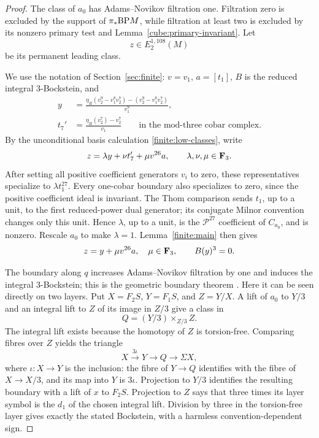 \begin{proof}
The class of \(a_0\) has Adams--Novikov filtration one.  Filtration
zero is excluded by the support of \(\pi_*\mathrm{BP} M\), while filtration
at least two is excluded by its nonzero primary test and
Lemma~\ref{cube:primary-invariant}.  Let
\[
 z\in E_2^{1,108}(M)
\]
be its permanent leading class.

We use the notation of Section~\ref{sec:finite}: \(v=v_1\),
\(a=[t_1]\), \(B\) is the reduced integral 3-Bockstein, and
\begin{align*}
 y&=\frac{\eta_R(v_2^9-v_1^8v_2^7)-(v_2^9-v_1^8v_2^7)}{v_1^9},\\
 t_7'&=\frac{\eta_R(v_2^7)-v_2^7}{v_1}
 \qquad\text{in the mod-three cobar complex}.
\end{align*}
By the unconditional basis calculation \eqref{finite:low-classes}, write
\[
 z=\lambda y+\nu t'_7+\mu v^{26}a,
 \qquad \lambda,\nu,\mu\in\mathbf F_3.
\]
After setting all positive coefficient generators \(v_i\) to zero,
these representatives specialize to \(\lambda t_1^{27}\).
Every one-cobar boundary also specializes to zero, since the
positive coefficient ideal is invariant.  The Thom comparison
sends \(t_1\), up to a unit, to the first reduced-power dual
generator; its conjugate Milnor convention changes only this
unit.  Hence \(\lambda\), up to a unit, is the
\(\mathcal P^{27}\) coefficient of \(C_{a_0}\), and is nonzero.
Rescale \(a_0\) to make \(\lambda=1\).
Lemma~\ref{finite:main} then gives
\begin{equation}\label{cube:leading-class}
 z=y+\mu v^{26}a,\quad\mu\in\mathbf F_3,\qquad B(y)^3=0.
\end{equation}

The boundary along \(q\) increases Adams--Novikov filtration by one
and induces the integral 3-Bockstein; this is the geometric boundary
theorem \cite[Theorem~2.3.4]{Ravenel}.  Here it can be seen directly
on two layers.  Put \(X=F_2S\), \(Y=F_1S\), and \(Z=Y/X\).
A lift of \(a_0\) to \(Y/3\) and an integral lift to \(Z\) of its
image in \(Z/3\) give a class in
\[
 Q=(Y/3)\mathbin{\times}_{Z/3}Z.
\]
The integral lift exists because the homotopy of \(Z\) is
torsion-free.  Comparing fibres over \(Z\) yields the triangle
\[
 X\xrightarrow{\,3\iota\,}Y
 \longrightarrow Q\longrightarrow\Sigma X,
\]
where \(\iota:X\to Y\) is the inclusion: the fibre of
\(Y\to Q\) identifies with the fibre of \(X\to X/3\),
and its map into \(Y\) is \(3\iota\).
Projection to \(Y/3\) identifies the resulting boundary with a lift
of \(x\) to \(F_2S\).  Projection to \(Z\) says that three times its
layer symbol is the \(d_1\) of the chosen integral lift.  Division
by three in the torsion-free layer gives exactly the stated
Bockstein, with a harmless convention-dependent sign.


\end{proof}
